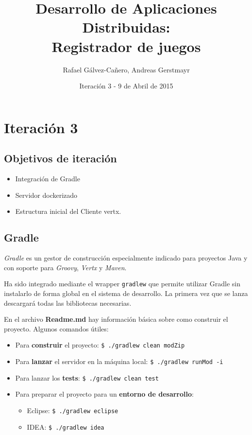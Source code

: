 \documentclass[12pt,a4paper]{report}
\title{Desarrollo de Aplicaciones Distribuidas: \\ Registrador de juegos}
\author{Rafael Gálvez-Cañero, Andreas Gerstmayr}
\date{Iteración 3 - 9 de Abril de 2015} %
\begin{document}
\maketitle
\tableofcontents
\listoffigures
\listoftables






\chapter{Iteración 3}
\section{Objetivos de iteración}
\begin{itemize}
  \item Integración de Gradle 
  \item Servidor dockerizado
  \item Estructura inicial del Cliente vertx.
\end{itemize}

\section{Gradle}
\emph{Gradle} es un gestor de construcción especialmente indicado para proyectos
Java y con soporte para \emph{Groovy}, \emph{Vertx} y \emph{Maven}.

Ha sido integrado mediante el wrapper \texttt{gradlew} que permite utilizar Gradle sin
instalarlo de forma global en el sistema de desarrollo. La primera vez que se
lanza descargará todas las bibliotecas necesarias.

En el archivo \textbf{Readme.md} hay información básica sobre como construir el
proyecto. Algunos comandos útiles:

\begin{itemize}
 \item Para \textbf{construir} el proyecto: \texttt{\$ ./gradlew clean modZip}
 \item Para \textbf{lanzar} el servidor en la máquina local: \texttt{\$ ./gradlew runMod -i}
 \item Para lanzar los \textbf{tests}: \texttt{\$ ./gradlew clean test}
 \item Para preparar el proyecto para un \textbf{entorno de desarrollo}:
    \begin{itemize}
      \item Eclipse: \texttt{\$ ./gradlew eclipse}
      \item IDEA: \texttt{\$ ./gradlew idea}
    \end{itemize}
\end{itemize}
\end{document}
